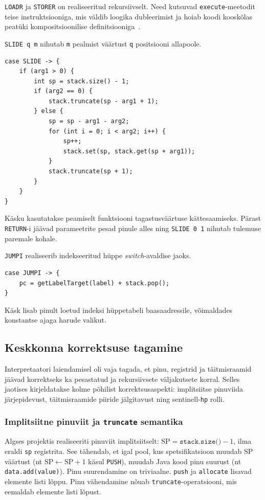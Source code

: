 \texttt{LOADR} ja \texttt{STORER} on realiseeritud rekursiivselt. Need kutsuvad \texttt{execute}-meetodit teise instruktsiooniga, mis väldib loogika dubleerimist ja hoiab koodi kooskõlas peatüki kompositsioonilise definitsiooniga~\cite{wilhelm_imperative_2010}.

\texttt{SLIDE q m} nihutab \texttt{m} pealmist väärtust \texttt{q} positsiooni allapoole.
\begin{verbatim}
case SLIDE -> {
    if (arg1 > 0) {
        int sp = stack.size() - 1;
        if (arg2 == 0) {
            stack.truncate(sp - arg1 + 1);
        } else {
            sp = sp - arg1 - arg2;
            for (int i = 0; i < arg2; i++) {
                sp++;
                stack.set(sp, stack.get(sp + arg1));
            }
            stack.truncate(sp + 1);
        }
    }
}
\end{verbatim}

Käsku kasutatakse peamiselt funktsiooni tagastusväärtuse kättesaamiseks. Pärast \texttt{RETURN}-i jäävad parameetrite pesad pinule alles ning \texttt{SLIDE 0 1} nihutab tulemuse paremale kohale.

\texttt{JUMPI} realiseerib indekseeritud hüppe \emph{switch}-avaldise jaoks.
\begin{verbatim}
case JUMPI -> {
    pc = getLabelTarget(label) + stack.pop();
}
\end{verbatim}

Käsk lisab pinult loetud indeksi hüppetabeli baasaadressile, võimaldades konstantse ajaga harude valikut.

\subsection{Keskkonna korrektsuse tagamine}\label{teostus:keskkond}

Interpretaatori laiendamisel oli vaja tagada, et pinu, registrid ja täitmisraamid jäävad korrektseks ka pesastatud ja rekursiivsete väljakutsete korral. Selles jaotises kirjeldatakse kolme põhilist korrektsusaspekti: implitsiitse pinuviida järjepidevust, täitmisraamide piiride jälgitavust ning sentinell-\texttt{hp} rolli.

\subsubsection{Implitsiitne pinuviit ja \texttt{truncate} semantika}

Algses projektis realiseeriti pinuviit implitsiitselt: $\text{SP} = \texttt{stack.size()} - 1$, ilma eraldi \texttt{sp} registrita. See tähendab, et igal pool, kus spetsifikatsioon muudab $\text{SP}$ väärtust (nt $\text{SP} \gets \text{SP} + 1$ käsul \texttt{PUSH}), muudab Java kood pinu suurust (nt \texttt{data.add(value)}). Pinu suurendamine on triviaalne. \texttt{push} ja \texttt{allocate} lisavad elemente listi lõppu. Pinu vähendamine nõuab \texttt{truncate}-operatsiooni, mis eemaldab elemente listi lõpust.

